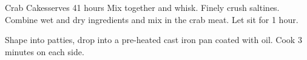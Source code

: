 
\begin{recipe}{Crab Cakes}{serves 4}{1 hours}
  Mix together and whisk.
  Finely crush saltines.
  Combine wet and dry ingredients and mix in the crab meat.  Let sit for 1 hour.
  
  Shape into patties, drop into a pre-heated cast iron pan coated with oil.  Cook 3 minutes on each side.
\end{recipe}
